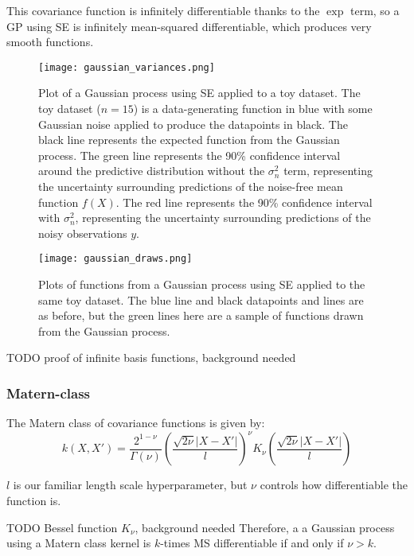 This covariance function is infinitely differentiable thanks to the $\exp$ term, so a GP using SE is infinitely mean-squared differentiable, which produces very smooth functions.

\begin{figure}[h]
    \texttt{[image: gaussian\_variances.png]}
    \caption{
        Plot of a Gaussian process using SE applied to a toy dataset. The toy dataset ($n = 15$) is a data-generating function in blue with some Gaussian noise applied to produce the datapoints in black. The black line represents the expected function from the Gaussian process. The green line represents the 90\% confidence interval around the predictive distribution without the $\sigma^2_n$ term, representing the uncertainty surrounding predictions of the noise-free mean function $f(X)$. The red line represents the 90\% confidence interval with $\sigma^2_n$, representing the uncertainty surrounding predictions of the noisy observations $y$.
    }
\end{figure}

\begin{figure}[h]
    \texttt{[image: gaussian\_draws.png]}
    \caption{
        Plots of functions from a Gaussian process using SE applied to the same toy dataset. The blue line and black datapoints and lines are as before, but the green lines here are a sample of functions drawn from the Gaussian process.
    }
\end{figure}

TODO proof of infinite basis functions, background needed



\newpage
\subsubsection{Matern-class}
The Matern class of covariance functions is given by:
\begin{equation*}
    k(X,X') = \frac{2^{1 - \nu}}{\Gamma(\nu)}\left(\frac{\sqrt{2\nu}|X - X'|}{l}\right)^{\nu}K_{\nu}\left(\frac{\sqrt{2\nu}|X - X'|}{l}\right)
\end{equation*}

$l$ is our familiar length scale hyperparameter, but $\nu$ controls how differentiable the function is. 

TODO Bessel function $K_{\nu}$, background needed
Therefore, a a Gaussian process using a Matern class kernel is $k$-times MS differentiable if and only if $\nu > k$. 

